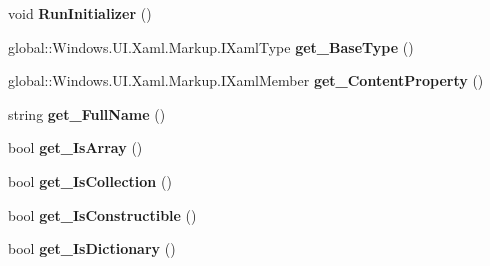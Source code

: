 \begin{DoxyCompactItemize}
void {\bfseries Run\+Initializer} ()
\item 
\mbox{\label{interface_windows_1_1_u_i_1_1_xaml_1_1_markup_1_1_i_xaml_type_a25118da9dba36c6dcde8724ccbe078b0}} 
global\+::\+Windows.\+U\+I.\+Xaml.\+Markup.\+I\+Xaml\+Type {\bfseries get\+\_\+\+Base\+Type} ()
\item 
\mbox{\label{interface_windows_1_1_u_i_1_1_xaml_1_1_markup_1_1_i_xaml_type_aa0f823851084ebadb94e1bc55468b1dc}} 
global\+::\+Windows.\+U\+I.\+Xaml.\+Markup.\+I\+Xaml\+Member {\bfseries get\+\_\+\+Content\+Property} ()
\item 
\mbox{\label{interface_windows_1_1_u_i_1_1_xaml_1_1_markup_1_1_i_xaml_type_a5c1dd332e5b51cd2bb878fc56640a7a8}} 
string {\bfseries get\+\_\+\+Full\+Name} ()
\item 
\mbox{\label{interface_windows_1_1_u_i_1_1_xaml_1_1_markup_1_1_i_xaml_type_a16b5c5eaeeaad7ca4f010931852df7e4}} 
bool {\bfseries get\+\_\+\+Is\+Array} ()
\item 
\mbox{\label{interface_windows_1_1_u_i_1_1_xaml_1_1_markup_1_1_i_xaml_type_a979e0b0e073ddfb9b26002ca80cd7af7}} 
bool {\bfseries get\+\_\+\+Is\+Collection} ()
\item 
\mbox{\label{interface_windows_1_1_u_i_1_1_xaml_1_1_markup_1_1_i_xaml_type_a36b2295d77f635d1f86673a460235f92}} 
bool {\bfseries get\+\_\+\+Is\+Constructible} ()
\item 
\mbox{\label{interface_windows_1_1_u_i_1_1_xaml_1_1_markup_1_1_i_xaml_type_a3508951681e7a45a895f3449fdda3a7c}} 
bool {\bfseries get\+\_\+\+Is\+Dictionary} ()
\item 
\mbox{\label{interface_windows_1_1_u_i_1_1_xaml_1_1_markup_1_1_i_xaml_type_aeee5bbd4f909ca50e0b2821c7b7da4e4}} 

\end{DoxyCompactItemize}
